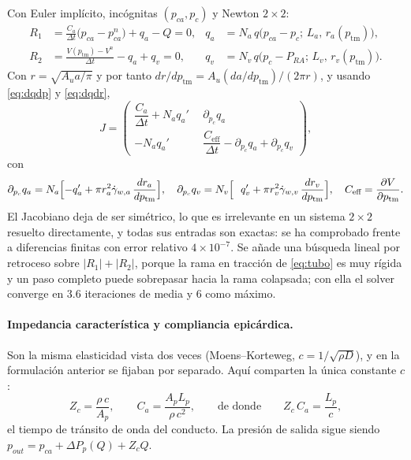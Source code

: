 \documentclass[11pt]{article}
\newcommand{\dd}[2]{\frac{\partial #1}{\partial #2}}
\newcommand{\ptm}{p_{\mathrm{tm}}}
\begin{document}
Con Euler impl\'icito, inc\'ognitas $(p_{ca},p_c)$ y Newton $2\times2$:
\begin{align}
  R_1&=\frac{C_a}{\Delta t}\bigl(p_{ca}-p_{ca}^{n}\bigr)+q_a-Q=0,
  &q_a&=N_a\,q\bigl(p_{ca}-p_c;\,L_a,\,r_a(\ptm)\bigr),
  \label{eq:R1}\\
  R_2&=\frac{V(\ptm)-V^{n}}{\Delta t}-q_a+q_v=0,
  &q_v&=N_v\,q\bigl(p_c-P_{RA};\,L_v,\,r_v(\ptm)\bigr) .
  \label{eq:R2}
\end{align}
Con $r=\sqrt{A_u a/\pi}$ y por tanto
$dr/d\ptm=A_u(da/d\ptm)/(2\pi r)$, y usando \eqref{eq:dqdp} y \eqref{eq:dqdr},
\begin{equation}
  J=\begin{pmatrix}
    \dfrac{C_a}{\Delta t}+N_a q_a' & \ \ \partial_{p_c}q_a\\[8pt]
    -N_a q_a' & \ \ \dfrac{C_{\text{eff}}}{\Delta t}-\partial_{p_c}q_a
      +\partial_{p_c}q_v
  \end{pmatrix},
  \label{eq:jac}
\end{equation}
con
\begin{equation}
  \partial_{p_c}q_a=N_a\Bigl[-q_a'+\pi r_a^{2}\dot\gamma_{w,a}\,\frac{dr_a}{d\ptm}\Bigr],
  \quad
  \partial_{p_c}q_v=N_v\Bigl[\ \ q_v'+\pi r_v^{2}\dot\gamma_{w,v}\,\frac{dr_v}{d\ptm}\Bigr],
  \quad
  C_{\text{eff}}=\dd{V}{\ptm} .
\end{equation}
El Jacobiano deja de ser sim\'etrico, lo que es irrelevante en un sistema
$2\times2$ resuelto directamente, y todas sus entradas son exactas: se ha
comprobado frente a diferencias finitas con error relativo $4\times10^{-7}$. Se
a\~nade una b\'usqueda lineal por retroceso sobre $|R_1|+|R_2|$, porque la rama
en tracci\'on de \eqref{eq:tubo} es muy r\'igida y un paso completo puede
sobrepasar hacia la rama colapsada; con ella el solver converge en $3.6$
iteraciones de media y $6$ como m\'aximo.

\paragraph{Impedancia caracter\'istica y compliancia epic\'ardica.} Son la misma
elasticidad vista dos veces (Moens--Korteweg, $c=1/\sqrt{\rho D}$), y en la
formulaci\'on anterior se fijaban por separado. Aqu\'i comparten la \'unica
constante $c$:
\begin{equation}
  Z_c=\frac{\rho\,c}{A_p},
  \qquad
  C_a=\frac{A_p L_p}{\rho\,c^{2}},
  \qquad\text{de donde}\qquad
  Z_c\,C_a=\frac{L_p}{c},
  \label{eq:zc}
\end{equation}
el tiempo de tr\'ansito de onda del conducto. La presi\'on de salida sigue
siendo $p_{out}=p_{ca}+\Delta P_p(Q)+Z_cQ$.
\end{document}
